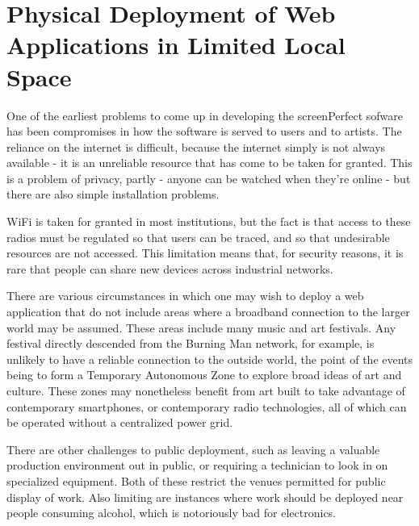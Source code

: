 
\chapter{Physical Deployment of Web Applications in Limited Local Space} %

\label{Chapter4} %



One of the earliest problems to come up in developing the screenPerfect sofware has been compromises in how the software is served to users and to artists. The reliance on the internet is difficult, because the internet simply is not always available - it is an unreliable resource that has come to be taken for granted. This is a problem of privacy, partly - anyone can be watched when they're online - but there are also simple installation problems.

WiFi is taken for granted in most institutions, but the fact is that access to these radios must be regulated so that users can be traced, and so that undesirable resources are not accessed. This limitation means that, for security reasons, it is rare that people can share new devices across industrial networks.

There are various circumstances in which one may wish to deploy a web application that do not include areas where a broadband connection to the larger world may be assumed. These areas include many music and art festivals. Any festival directly descended from the Burning Man network, for example, is unlikely to have a reliable connection to the outside world, the point of the events being to form a Temporary Autonomous Zone \cite{taz} to explore broad ideas of art and culture. These zones may nonetheless benefit from art built to take advantage of contemporary smartphones, or contemporary radio technologies, all of which can be operated without a centralized power grid.

There are other challenges to public deployment, such as leaving a valuable production environment out in public, or requiring a technician to look in on specialized equipment. Both of these restrict the venues permitted for public display of work. Also limiting are instances where work should be deployed near people consuming alcohol, which is notoriously bad for electronics.

